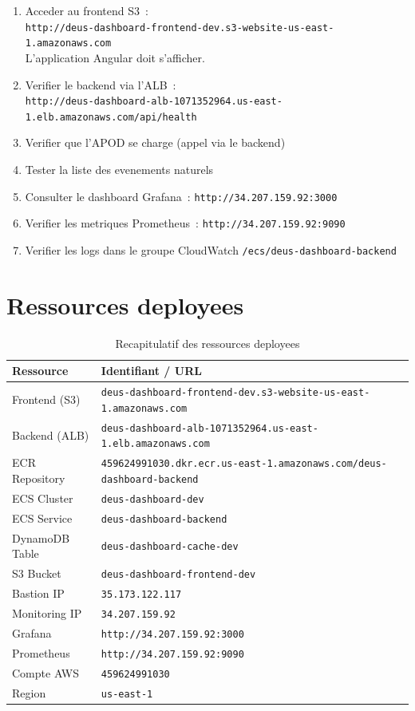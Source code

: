 \begin{enumerate}
    \item Acceder au frontend S3~:\\
        \texttt{http://deus-dashboard-frontend-dev.s3-website-us-east-1.amazonaws.com}\\
        L'application Angular doit s'afficher.
    \item Verifier le backend via l'ALB~:\\
        \texttt{http://deus-dashboard-alb-1071352964.us-east-1.elb.amazonaws.com/api/health}
    \item Verifier que l'APOD se charge (appel via le backend)
    \item Tester la liste des evenements naturels
    \item Consulter le dashboard Grafana~: \texttt{http://34.207.159.92:3000}
    \item Verifier les metriques Prometheus~: \texttt{http://34.207.159.92:9090}
    \item Verifier les logs dans le groupe CloudWatch
        \texttt{/ecs/deus-dashboard-backend}
\end{enumerate}

\section{Ressources deployees}

\begin{table}[H]
    \centering
    \begin{tabularx}{\textwidth}{lX}
        \toprule
        \textbf{Ressource} & \textbf{Identifiant / URL} \\
        \midrule
        Frontend (S3) & \texttt{deus-dashboard-frontend-dev.s3-website-us-east-1.amazonaws.com} \\
        Backend (ALB) & \texttt{deus-dashboard-alb-1071352964.us-east-1.elb.amazonaws.com} \\
        ECR Repository & \texttt{459624991030.dkr.ecr.us-east-1.amazonaws.com/deus-dashboard-backend} \\
        ECS Cluster & \texttt{deus-dashboard-dev} \\
        ECS Service & \texttt{deus-dashboard-backend} \\
        DynamoDB Table & \texttt{deus-dashboard-cache-dev} \\
        S3 Bucket & \texttt{deus-dashboard-frontend-dev} \\
        Bastion IP & \texttt{35.173.122.117} \\
        Monitoring IP & \texttt{34.207.159.92} \\
        Grafana & \texttt{http://34.207.159.92:3000} \\
        Prometheus & \texttt{http://34.207.159.92:9090} \\
        Compte AWS & \texttt{459624991030} \\
        Region & \texttt{us-east-1} \\
        \bottomrule
    \end{tabularx}
    \caption{Recapitulatif des ressources deployees}
\end{table}

